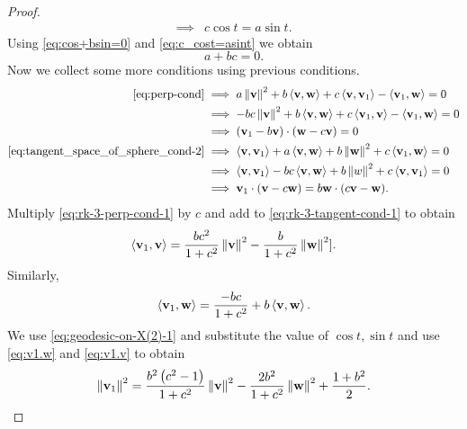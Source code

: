 \begin{proof}
\begin{align}
		\implies & c\cos t = a\sin t\label{eq:c_cost=asint}.
	\end{align}
	Using \eqref{eq:cos+bsin=0} and \eqref{eq:c_cost=asint} we obtain 
	\begin{equation*}
		 a+bc=0 \label{eq:a+bc=0}.
	\end{equation*} 
	Now we collect some more conditions using previous conditions. 
	\begin{align}
		\eqref{eq:perp-cond} & \implies a \left\|\mathbf{v}\right\|^2 + b \left\langle \mathbf{v},\mathbf{w} \right\rangle + c \left\langle \mathbf{v},\mathbf{v}_1 \right\rangle - \left\langle \mathbf{v}_1,\mathbf{w} \right\rangle =0\label{eq:rk-3-perp-cond-1}
		\\
		& \implies -bc \left\|\mathbf{v}\right\|^2+b \left\langle \mathbf{v},\mathbf{w} \right\rangle+c \left\langle \mathbf{v}_1,\mathbf{v} \right\rangle - \left\langle \mathbf{v}_1,\mathbf{w} \right\rangle=0\nonumber
		\\ 
		& \implies \left(\mathbf{v}_1-b\mathbf{v}\right)\cdot (\mathbf{w}-c\mathbf{v})=0 \nonumber
		\\
		\eqref{eq:tangent_space_of_sphere_cond-2} & \implies \left\langle \mathbf{v},\mathbf{v}_1 \right\rangle+ a \left\langle \mathbf{v},\mathbf{w} \right\rangle+ b \left\|\mathbf{w}\right\|^2+ c \left\langle \mathbf{v}_1,\mathbf{w} \right\rangle=0 \label{eq:rk-3-tangent-cond-1}
		\\
		& \implies \left\langle \mathbf{v},\mathbf{v}_1 \right\rangle-bc \left\langle \mathbf{v},\mathbf{w} \right\rangle+b \left\|w\right\|^2+ c \left\langle \mathbf{v},\mathbf{v}_1 \right\rangle=0 \nonumber 
		\\ 
		& \implies \mathbf{v}_1\cdot (\mathbf{v}-c\mathbf{w})=b\mathbf{w}\cdot (c\mathbf{v}-\mathbf{w})\nonumber. 
	\end{align}
	Multiply \eqref{eq:rk-3-perp-cond-1} by $c$ and add to \eqref{eq:rk-3-tangent-cond-1} to obtain 
	\begin{equation}
		 \left\langle \mathbf{v}_1,\mathbf{v} \right\rangle = \frac{bc^2}{1+c^2}\left\|\mathbf{v}\right\|^2- \frac{b}{1+c^2}\left\|\mathbf{w}\right\|^2 ]\label{eq:v1.v}. 
	\end{equation}
	Similarly, 
	\begin{equation}
		 \left\langle \mathbf{v}_1,\mathbf{w} \right\rangle = \frac{-bc}{1+c^2}+b \left\langle \mathbf{v},\mathbf{w} \right\rangle \label{eq:v1.w}.
	\end{equation}
	We use \eqref{eq:geodesic-on-X(2)-1} and substitute the value of $\cos t,\sin t$ and use \eqref{eq:v1.w} and \eqref{eq:v1.v} to obtain 
	\begin{equation*}
		 \left\|\vbf_1\right\|	^2= \frac{b^2 \left(c^2-1\right)}{1+c^2} \left\|\vbf\right\|^2- \frac{2b^2}{1+c^2} \left\|\wbf\right\|^2+ \frac{1+b^2}{2} \label{eq:v_1-norm}. 

\end{equation*}
\end{proof}

